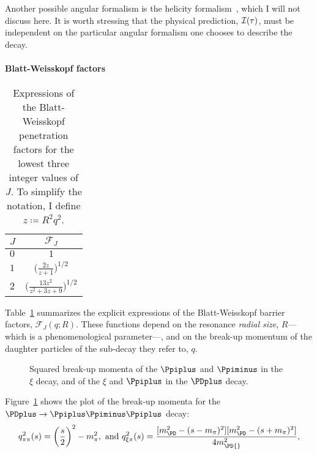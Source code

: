     Another possible angular formalism is the helicity formalism~\cite{jacob1959404}, which I will not discuss here.
    It is worth stressing that the physical prediction, $\mathcal{I}(\tau)$, must be independent on the particular angular formalism one chooses to describe the decay.


    \paragraph{Blatt-Weisskopf factors}

    \begin{table}
        \centering
        \caption{Expressions of the Blatt-Weisskopf penetration factors for the lowest three integer values of $J$. To simplify the notation, I define $z\coloneqq R^2 q^2$.}
        \label{table:blatt_weisskopf}
        \begin{tabular}{lc}
            \toprule
            $J$ &$\mathcal{F}_{\!J}$\\
            \midrule
            $0$ &$1$ \\
            $1$ &$\bigg(\displaystyle\frac{2z}{z + 1}\bigg)^{1/2}$ \\
            $2$ &$\bigg(\displaystyle\frac{13 z^2 }{z^2 + 3z + 9}\bigg)^{1/2}$ \\
            \bottomrule
        \end{tabular}
    \end{table}
    Table~\ref{table:blatt_weisskopf} summarizes the explicit expressions of the Blatt-Weisskopf barrier factors, $\mathcal{F}_{\!J}(q; R)$.
    These functions depend on the resonance \emph{radial size}, $R$---which is a phenomenological parameter---, and on the break-up momentum of the daughter particles of the sub-decay they refer to, $q$.
    \begin{figure}
        \centering
        
        \caption{Squared break-up momenta of the $\Ppiplus$ and $\Ppiminus$ in the $\xi$ decay, and of the $\xi$ and $\Ppiplus$ in the $\PDplus$ decay.}
        \label{fig:break_up_momenta}
    \end{figure}
    Figure~\ref{fig:break_up_momenta} shows the plot of the break-up momenta for the $\PDplus\to\Ppiplus\Ppiminus\Ppiplus$ decay:
    \begin{equation}
        q_{\pi\pi}^2(s) = \bigg(\frac{s}{2}\bigg)^2 - m_{\pi}^2,
        \text{ and }
        q_{\xi\pi}^2(s) = \frac{[m_{\PD}^2 - (s - m_\pi)^2][m_{\PD}^2 - (s+m_\pi)^2]}{4m_{\PD{}}^2},
    \end{equation}
